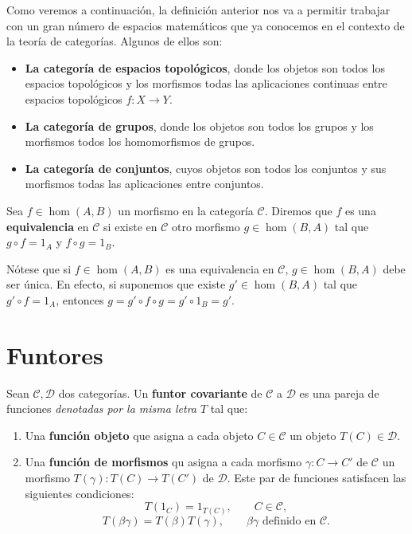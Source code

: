 \begin{ejemplo}
	Como veremos a continuación, la definición anterior nos va a permitir trabajar con un gran número de espacios matemáticos que ya conocemos en el contexto de la teoría de categorías. Algunos de ellos son:
	\begin{itemize}
		\item \textbf{La categoría de espacios topológicos}, donde los objetos son todos los espacios topológicos y los morfismos todas las aplicaciones continuas entre espacios topológicos $f: X \rightarrow Y$.
		\item \textbf{La categoría de grupos}, donde los objetos son todos los grupos y los morfismos todos los homomorfismos de grupos.
		\item \textbf{La categoría de conjuntos}, cuyos objetos son todos los conjuntos y sus morfismos todas las aplicaciones entre conjuntos.
	\end{itemize}
\end{ejemplo}

\begin{definicion}
	Sea $f \in \hom(A,B)$ un morfismo en la categoría $\mathcal{C}$. Diremos que $f$ es una \textbf{equivalencia} en $\mathcal{C}$ si existe en $\mathcal{C}$ otro morfismo $g \in \hom(B,A)$ tal que $g \circ f = 1_A$ y $f \circ g = 1_B$.
\end{definicion}

Nótese que si $f \in \hom(A,B)$ es una equivalencia en $\mathcal{C}$, $g \in \hom(B,A)$ debe ser única. En efecto, si suponemos que existe $g' \in \hom(B,A)$ tal que $g' \circ f = 1_A$, entonces $g = g'\circ f \circ g = g' \circ 1_B = g'$.

\section{Funtores}

\begin{definicion}
	Sean $\mathcal{C}, \mathcal{D}$ dos categorías. Un \textbf{funtor covariante} de $\mathcal{C}$ a $\mathcal{D}$ es una pareja de funciones \textit{denotadas por la misma letra $T$} tal que:
	\begin{enumerate}
		\item Una \textbf{función objeto} que asigna a cada objeto $C \in \mathcal{C}$ un objeto $T(C) \in \mathcal{D}$.
		\item Una \textbf{función de morfismos} qu asigna a cada morfismo $\gamma: C \rightarrow C'$ de $\mathcal{C}$ un morfismo $T(\gamma): T(C) \rightarrow T(C')$ de $\mathcal{D}$. Este par de funciones satisfacen las siguientes condiciones:
		\begin{equation}
			T(1_C) = 1_{T(C)}, \qquad C \in \mathcal{C},
		\end{equation}
		\begin{equation}
			T(\beta \gamma) = T(\beta)T(\gamma), \qquad \beta \gamma \text{ definido en } \mathcal{C}.
		\end{equation}
	\end{enumerate}
\end{definicion}

